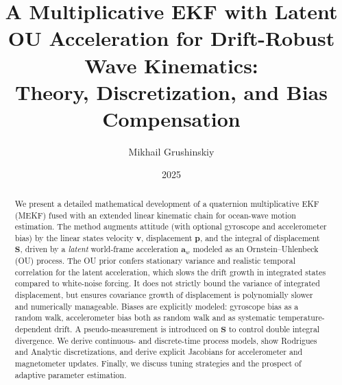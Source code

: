 \documentclass[10pt]{extarticle}
\title{A Multiplicative EKF with Latent OU Acceleration for Drift-Robust Wave Kinematics: \\
Theory, Discretization, and Bias Compensation}
\author{Mikhail Grushinskiy}
\date{2025}
\begin{document}
\maketitle

\begin{abstract}
We present a detailed mathematical development of a quaternion multiplicative EKF (MEKF) fused with an extended 
linear kinematic chain for ocean-wave motion estimation. 
The method augments attitude (with optional gyroscope and accelerometer bias) by the linear states velocity $\bm v$, displacement $\bm p$, 
and the integral of displacement $\bm S$, driven by a \emph{latent} world-frame acceleration $\bm a_w$ modeled as an Ornstein--Uhlenbeck (OU) process. The OU prior confers stationary variance and realistic temporal correlation for the latent acceleration, which slows the drift growth in integrated states compared to white-noise forcing. It does not strictly bound the variance of integrated displacement, but ensures covariance growth of displacement is polynomially slower and numerically manageable.
Biases are explicitly modeled: gyroscope bias as a random walk, accelerometer bias both as random walk and as systematic temperature-dependent drift. 
A pseudo-measurement is introduced on $\bm S$ to control double integral divergence. 
We derive continuous- and discrete-time process models, show Rodrigues and Analytic discretizations, and derive explicit Jacobians for accelerometer and magnetometer updates. 
Finally, we discuss tuning strategies and the prospect of adaptive parameter estimation.
\end{abstract}

\tableofcontents
\newpage




\end{document}
